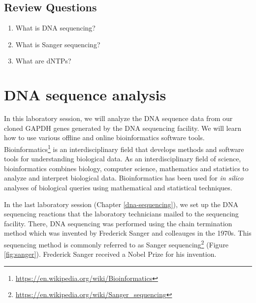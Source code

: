 \documentclass[]{book}
\providecommand{\tightlist}{%
  \setlength{\itemsep}{0pt}\setlength{\parskip}{0pt}}
\let\rmarkdownfootnote\footnote%
\def\footnote{\protect\rmarkdownfootnote}
\renewcommand{\href}[2]{#2\footnote{\url{#1}}}
\theoremstyle{definition}
\theoremstyle{definition}
\theoremstyle{definition}
\theoremstyle{remark}
\begin{document}
\section{Review Questions}\label{review-questions-8}

\begin{enumerate}
\def\labelenumi{\arabic{enumi}.}
\tightlist
\item
  What is DNA sequencing?
\item
  What is Sanger sequencing?
\item
  What are dNTPs?
\end{enumerate}

\chapter{DNA sequence analysis}\label{dna-sequence-analysis}

In this laboratory session, we will analyze the DNA sequence data from
our cloned GAPDH genes generated by the DNA sequencing facility. We will
learn how to use various offline and online bioinformatics software
tools.
\href{https://en.wikipedia.org/wiki/Bioinformatics}{Bioinformatics} is
an interdisciplinary field that develops methods and software tools for
understanding biological data. As an interdisciplinary field of science,
bioinformatics combines biology, computer science, mathematics and
statistics to analyze and interpret biological data. Bioinformatics has
been used for \emph{in silico} analyses of biological queries using
mathematical and statistical techniques.

In the last laboratory session (Chapter \ref{dna-sequencing}), we set up
the DNA sequencing reactions that the laboratory technicians mailed to
the sequencing facility. There, DNA sequencing was performed using the
chain termination method which was invented by Frederick Sanger and
colleauges in the 1970s. This sequencing method is commonly referred to
as \href{https://en.wikipedia.org/wiki/Sanger_sequencing}{Sanger
sequencing} (Figure \ref{fig:sanger}). Frederick Sanger received a Nobel
Prize for his invention.
\end{document}
